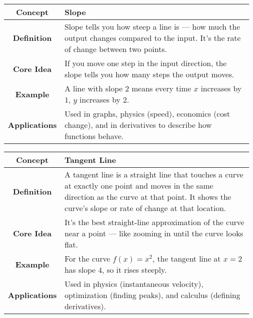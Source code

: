 \begin{NxLightBox}[title={Slope}]
    \begingroup
    \renewcommand{\arraystretch}{1.8}
    \begin{tabularx}{\linewidth}{|c|X|}
        \hline
        \textbf{Concept} & Slope \\
        \hline
        \textbf{Definition} & Slope tells you how steep a line is — how much the output changes compared to the input. It’s the rate of change between two points. \\
        \hline
        \textbf{Core Idea} & If you move one step in the input direction, the slope tells you how many steps the output moves. \\
        \hline
        \textbf{Example} & A line with slope \( 2 \) means every time \( x \) increases by \( 1 \), \( y \) increases by \( 2 \). \\
        \hline
        \textbf{Applications} & Used in graphs, physics (speed), economics (cost change), and in derivatives to describe how functions behave. \\
        \hline
    \end{tabularx}
    \endgroup
\end{NxLightBox}

\begin{NxLightBox}[title={Tangent Line}]
    \begingroup
    \renewcommand{\arraystretch}{1.8}
    \begin{tabularx}{\linewidth}{|c|X|}
        \hline
        \textbf{Concept} & Tangent Line \\
        \hline
        \textbf{Definition} & A tangent line is a straight line that touches a curve at exactly one point and moves in the same direction as the curve at that point. It shows the curve’s slope or rate of change at that location. \\
        \hline
        \textbf{Core Idea} & It’s the best straight-line approximation of the curve near a point — like zooming in until the curve looks flat. \\
        \hline
        \textbf{Example} & For the curve \( f(x) = x^2 \), the tangent line at \( x = 2 \) has slope \( 4 \), so it rises steeply. \\
        \hline
        \textbf{Applications} & Used in physics (instantaneous velocity), optimization (finding peaks), and calculus (defining derivatives). \\
        \hline
    \end{tabularx}
    \endgroup
\end{NxLightBox}

